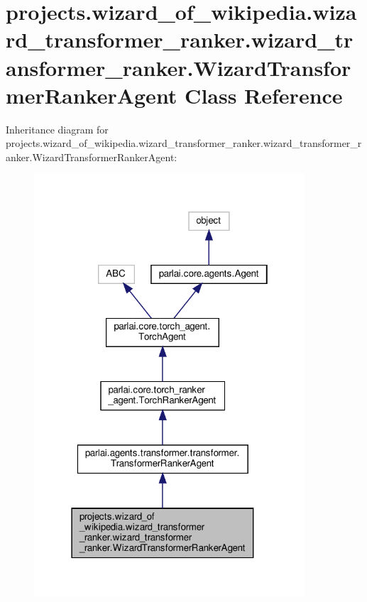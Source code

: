 \hypertarget{classprojects_1_1wizard__of__wikipedia_1_1wizard__transformer__ranker_1_1wizard__transformer__rad02f16524e5e0423aa3e2c69e1330ee1}{}\section{projects.\+wizard\+\_\+of\+\_\+wikipedia.\+wizard\+\_\+transformer\+\_\+ranker.\+wizard\+\_\+transformer\+\_\+ranker.\+Wizard\+Transformer\+Ranker\+Agent Class Reference}
\label{classprojects_1_1wizard__of__wikipedia_1_1wizard__transformer__ranker_1_1wizard__transformer__rad02f16524e5e0423aa3e2c69e1330ee1}


Inheritance diagram for projects.\+wizard\+\_\+of\+\_\+wikipedia.\+wizard\+\_\+transformer\+\_\+ranker.\+wizard\+\_\+transformer\+\_\+ranker.\+Wizard\+Transformer\+Ranker\+Agent\+:\nopagebreak
\begin{figure}[H]
\begin{center}
\leavevmode
\includegraphics[width=286pt]{d7/ddc/classprojects_1_1wizard__of__wikipedia_1_1wizard__transformer__ranker_1_1wizard__transformer__ra3da4565eed5ada720d89b79c5b539029}
\end{center}
\end{figure}


